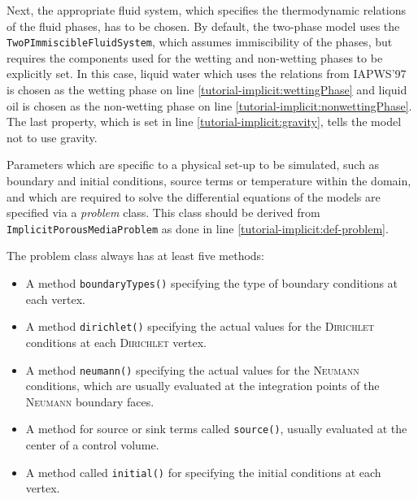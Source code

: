 Next, the appropriate fluid system, which specifies the thermodynamic
relations of the fluid phases, has to be chosen. By default, the
two-phase model uses the \texttt{TwoPImmiscibleFluidSystem}, which
assumes immiscibility of the phases, but requires the components
used for the wetting and non-wetting phases to be explicitly set. In
this case, liquid water which uses the relations from
IAPWS'97~\cite{IAPWS1997} is chosen as the wetting phase on line
\ref{tutorial-implicit:wettingPhase} and liquid oil is chosen as the
non-wetting phase on line \ref{tutorial-implicit:nonwettingPhase}. The
last property, which is set in line \ref{tutorial-implicit:gravity},
tells the model not to use gravity.

\label{tutorial-implicit:boundaryStart}Parameters which are specific to a physical set-up to be simulated,
such as boundary and initial conditions, source terms or temperature
within the domain, and which are required to solve the differential
equations of the models are specified via a \textit{problem} class. This class
should be derived from \texttt{ImplicitPorousMediaProblem} as done in line
\ref{tutorial-implicit:def-problem}.

The problem class always has at least five methods:
\begin{itemize}
\item A method \texttt{boundaryTypes()} specifying the type of
  boundary conditions at each vertex.
\item A method \texttt{dirichlet()} specifying the actual values for
  the \textsc{Dirichlet} conditions at each \textsc{Dirichlet} vertex.
\item A method \texttt{neumann()} specifying the actual values for
  the \textsc{Neumann} conditions, which are usually evaluated at the
  integration points of the \textsc{Neumann} boundary faces.
\item A method for source or sink terms called \texttt{source()}, usually evaluated at
  the center of a control volume.
\item A method called \texttt{initial()} for specifying the initial
  conditions at each vertex.
\end{itemize}

